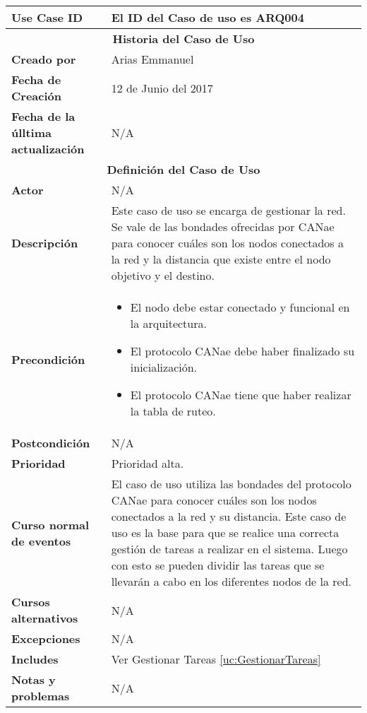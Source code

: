 \begin{longtable}{|p{5cm}|p{8cm}|}
  \hline
  \textbf{Use Case ID} & El ID del Caso de uso es ARQ004 \\ \hline
  \multicolumn{2}{|c|}{\Large\textbf{Historia del Caso de Uso}} \\ \hline
  \textbf{Creado por} & Arias Emmanuel \\ \hline
  \textbf{Fecha de Creación} & 12 de Junio del 2017 \\ \hline
  \textbf{Fecha de la úlltima actualización} & N/A \\ \hline
  \multicolumn{2}{|c|}{\Large\textbf{Definición del Caso de Uso}} \\ \hline
  \textbf{Actor} & N/A \\ \hline
  \textbf{Descripción} & Este caso de uso se encarga de gestionar la red. Se vale de las
bondades ofrecidas por CANae para conocer cuáles son los nodos
conectados a la red y la distancia que existe entre el nodo
objetivo y el destino. \\ \hline
  \textbf{Precondición} & \begin{itemize}
\item El nodo debe estar conectado y funcional en la arquitectura.
\item El protocolo CANae debe haber finalizado su inicialización.
\item El protocolo CANae tiene que haber realizar la tabla de ruteo.
\end{itemize} \\ \hline
  \textbf{Postcondición}  & N/A \\ \hline
  \textbf{Prioridad} & Prioridad alta. \\ \hline
  \textbf{Curso normal de eventos} & El caso de uso utiliza las bondades del protocolo CANae para conocer
cuáles son los nodos conectados a la red y su distancia. Este caso
de uso es la base para que se realice una correcta gestión de tareas
a realizar en el sistema. Luego con esto se pueden dividir las tareas que
se llevarán a cabo en los diferentes nodos de la red.  \\ \hline
\textbf{Cursos alternativos} & N/A \\ \hline
\textbf{Excepciones} & N/A \\ \hline
\textbf{Includes} & Ver Gestionar Tareas \ref{uc:GestionarTareas} \\ \hline
\textbf{Notas y problemas} & N/A \\ \hline
\end{longtable}

